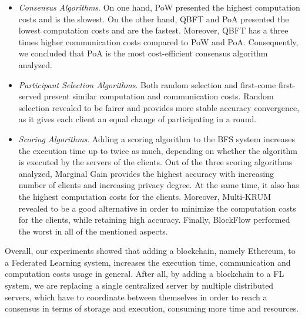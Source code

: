 \begin{itemize}
    \item \textit{Consensus Algorithms}. On one hand, PoW presented the highest computation costs and is the slowest. On the other hand, QBFT and PoA presented the lowest computation costs and are the fastest. Moreover, QBFT has a three times higher communication costs compared to PoW and PoA. Consequently, we concluded that PoA is the most cost-efficient consensus algorithm analyzed. %
    
    \item \textit{Participant Selection Algorithms}. Both random selection and first-come first-served present similar computation and communication costs. Random selection revealed to be fairer and provides more stable accuracy convergence, as it gives each client an equal change of participating in a round.
    
    \item \textit{Scoring Algorithms}. Adding a scoring algorithm to the BFS system increases the execution time up to twice as much, depending on whether the algorithm is executed by the servers of the clients. Out of the three scoring algorithms analyzed, Marginal Gain provides the highest accuracy with increasing number of clients and increasing privacy degree. At the same time, it also has the highest computation costs for the clients. Moreover, Multi-KRUM revealed to be a good alternative in order to minimize the computation costs for the clients, while retaining high accuracy. Finally, BlockFlow performed the worst in all of the mentioned aspects. %
\end{itemize}

Overall, our experiments showed that adding a blockchain, namely Ethereum, to a Federated Learning system, increases the execution time, communication and computation costs usage in general. After all, by adding a blockchain to a FL system, we are replacing a single centralized server by multiple distributed servers, which have to coordinate between themselves in order to reach a consensus in terms of storage and execution, consuming more time and resources. %

